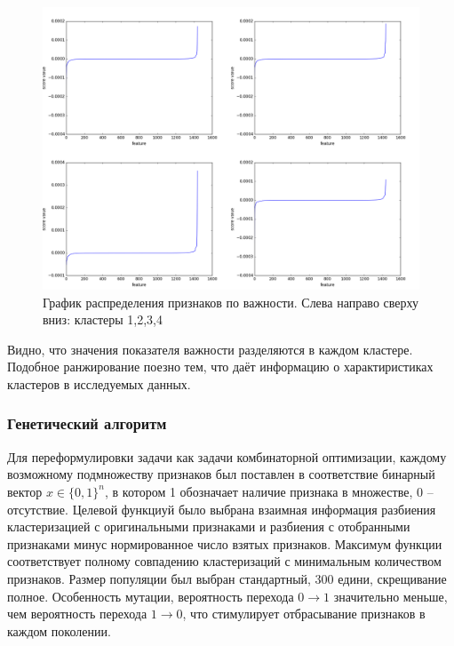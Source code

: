 \begin{figure}[H]
  \includegraphics[width=\linewidth]{pics/ndfs_unnorm_euclidean.png}
  \caption{График распределения признаков по важности. Слева направо сверху вниз: кластеры 1,2,3,4}
  \label{regularization_blob}
\end{figure}
Видно, что значения показателя важности разделяются в каждом кластере. Подобное ранжирование поезно тем, что даёт информацию о характиристиках кластеров в исследуемых данных.
\subsubsection{Генетический алгоритм}
Для переформулировки задачи как задачи комбинаторной оптимизации, каждому возможному подмножеству признаков был поставлен в соответствие бинарный вектор $x \in \{0,1\}^n$, в котором 1 обозначает наличие признака в множестве, 0 -- отсутствие. Целевой функциуй было выбрана взаимная информация разбиения кластеризацией с оригинальными признаками и разбиения с отобранными признаками минус нормированное число взятых признаков. Максимум функции соответствует полному совпадению кластеризаций с минимальным количеством признаков. Размер популяции был выбран стандартный, 300 едини, скрещивание полное. Особенность мутации, вероятность перехода $0 \rightarrow 1$ значительно меньше, чем вероятность перехода $1 \rightarrow 0$,  что стимулирует отбрасывание признаков в каждом поколении.
